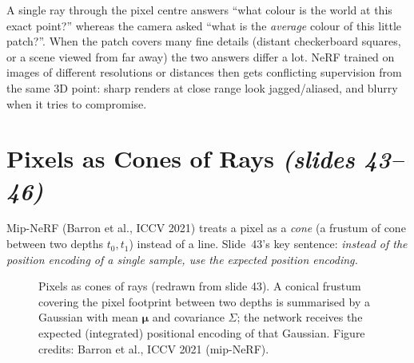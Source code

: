 \documentclass[11pt,a4paper]{article}
\newcommand{\sref}[1]{\texorpdfstring{\emph{(slides #1)}}{(slides #1)}}
\newcommand{\E}{\mathbb{E}}
\newcommand{\x}{{\bm{x}}}
\theoremstyle{definition}
\theoremstyle{plain}
\theoremstyle{remark}
\begin{document}
\begin{intuition}
A single ray through the pixel centre answers ``what colour is the world at this exact point?'' whereas the camera asked ``what is the \emph{average} colour of this little patch?''. When the patch covers many fine details (distant checkerboard squares, or a scene viewed from far away) the two answers differ a lot. NeRF trained on images of different resolutions or distances then gets conflicting supervision from the same 3D point: sharp renders at close range look jagged/aliased, and blurry when it tries to compromise.
\end{intuition}

\section{Pixels as Cones of Rays \sref{43--46}}

Mip-NeRF (Barron et al., ICCV 2021) treats a pixel as a \emph{cone} (a frustum of cone between two depths $t_0,t_1$) instead of a line. Slide~43's key sentence: \emph{instead of the position encoding of a single sample, use the expected position encoding.}

\begin{figure}[H]
\centering
{}
\caption{Pixels as cones of rays (redrawn from slide 43). A conical frustum covering the pixel footprint between two depths is summarised by a Gaussian with mean $\boldsymbol\mu$ and covariance $\Sigma$; the network receives the expected (integrated) positional encoding of that Gaussian. Figure credits: Barron et al., ICCV 2021 (mip-NeRF).}
\end{figure}
\end{document}
